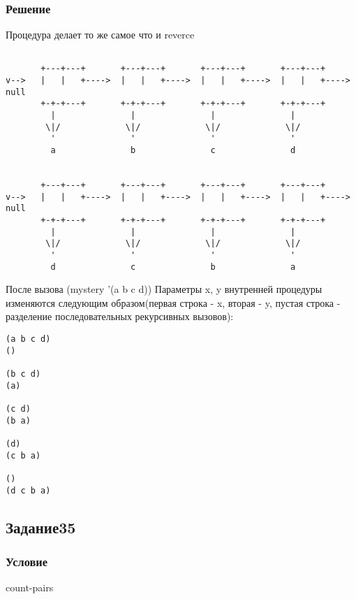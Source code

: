 \documentclass[10pt,a4paper]{article}
\begin{document}
\subsubsection*{Решение}
Процедура делает то же самое что и reverce

\begin{lstlisting}

       +---+---+       +---+---+       +---+---+       +---+---+
v-->   |   |   +---->  |   |   +---->  |   |   +---->  |   |   +---->  null
       +-+-+---+       +-+-+---+       +-+-+---+       +-+-+---+
         |               |               |               |
        \|/             \|/             \|/             \|/
         '               '               '               '
         a               b               c               d


       +---+---+       +---+---+       +---+---+       +---+---+
v-->   |   |   +---->  |   |   +---->  |   |   +---->  |   |   +----> null
       +-+-+---+       +-+-+---+       +-+-+---+       +-+-+---+
         |               |               |               |
        \|/             \|/             \|/             \|/
         '               '               '               '
         d               c               b               a

\end{lstlisting}
После вызова (mystery '(a b c d))  Параметры x, y внутренней процедуры
изменяются следующим образом(первая строка - x, вторая - y, пустая строка
- разделение последовательных рекурсивных вызовов): \\
\begin{lstlisting}
(a b c d) 
()

(b c d)
(a)

(c d)
(b a)

(d)
(c b a)

()
(d c b a)
\end{lstlisting}

\subsection*{Задание35}
\subsubsection*{Условие}
count-pairs
\end{document}

